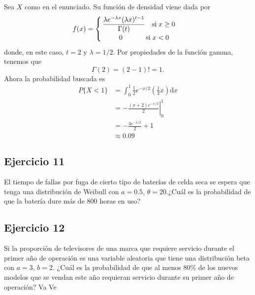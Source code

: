\begin{sol}
	Sea $X$ como en el enunciado. Su función de densidad viene dada por
	\[ 
	f(x) = \begin{cases}
	\hspace{.2em} \dfrac{\lambda e^{-\lambda x} (\lambda x)^{t-1}}{\Gamma(t)} \quad \text{si} \; x\geq 0 \\
	\hspace{2.6em} 0 \hspace{3.4em} \text{si} \; x<0
	\end{cases}
	\]
	donde, en este caso, $t=2$ y $\lambda = 1/2$.
	Por propiedades de la función gamma, tenemos que
	\[ \Gamma(2) = (2-1)! = 1. \]
	Ahora la probabilidad buscada es
	\begin{align*}
		P\{X<1\} &= \int_{0}^{1} \frac{1}{2} e^{-x/2} \left(\frac{1}{2} x\right) \mathrm{d}x \\
				 &= \left. -\frac{(x+2)e^{-x/2}}{2} \right\rvert_{0}^{1} \\
			   	 &= -\frac{3e^{-1/2}}{2} + 1 \\
				 &\approx 0.09
	\end{align*}
\end{sol}
\subsection*{Ejercicio 11}
	El tiempo de fallas por fuga de cierto tipo de baterías de celda seca se espera que tenga una distribución
	de Weibull con $a = 0.5$, $\theta = 20$.¿Cuál es la probabilidad de que la batería dure más de 800 horas en uso?

\begin{sol}
	
\end{sol}
\subsection*{Ejercicio 12}
	Si la proporción de televisores de una marca que requiere servicio durante el primer año de operación es
	una variable aleatoria que tiene una distribución beta con $a = 3$, $b = 2$. ¿Cuál es la probabilidad de que al menos
	80\% de los nuevos modelos que se vendan este año requieran servicio durante su primer año de operación? Va Ve

